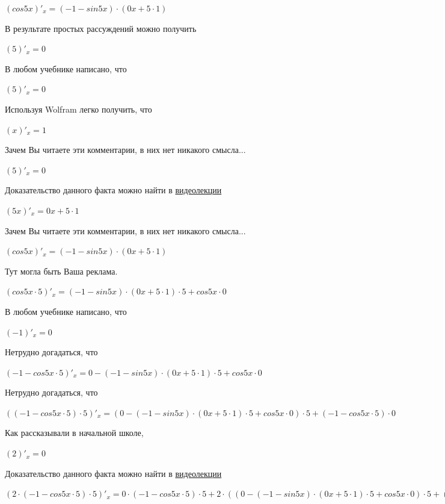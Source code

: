 \documentclass[12pt,a4paper,fleqn]{article}
\theoremstyle{definition}
\begin{document}
$(cos 5  x )'_{x} = ( -1  - sin 5  x ) \cdot ( 0  x  +  5  \cdot  1 )$

В результате простых рассуждений можно получить 

$( 5 )'_{x} =  0 $

В любом учебнике написано, что 

$( 5 )'_{x} =  0 $

Используя Wolfram легко получить, что 

$( x )'_{x} =  1 $

Зачем Вы читаете эти комментарии, в них нет никакого смысла... 

$( 5 )'_{x} =  0 $

Доказательство данного факта можно найти в \href{https://www.youtube.com/watch?v=dQw4w9WgXcQ}{видеолекции} 

$( 5  x )'_{x} =  0  x  +  5  \cdot  1 $

Зачем Вы читаете эти комментарии, в них нет никакого смысла... 

$(cos 5  x )'_{x} = ( -1  - sin 5  x ) \cdot ( 0  x  +  5  \cdot  1 )$

Тут могла быть Ваша реклама. 

$(cos 5  x  \cdot  5 )'_{x} = ( -1  - sin 5  x ) \cdot ( 0  x  +  5  \cdot  1 ) \cdot  5  + cos 5  x  \cdot  0 $

В любом учебнике написано, что 

$( -1 )'_{x} =  0 $

Нетрудно догадаться, что 

$( -1  - cos 5  x  \cdot  5 )'_{x} =  0  - ( -1  - sin 5  x ) \cdot ( 0  x  +  5  \cdot  1 ) \cdot  5  + cos 5  x  \cdot  0 $

Нетрудно догадаться, что 

$(( -1  - cos 5  x  \cdot  5 ) \cdot  5 )'_{x} = ( 0  - ( -1  - sin 5  x ) \cdot ( 0  x  +  5  \cdot  1 ) \cdot  5  + cos 5  x  \cdot  0 ) \cdot  5  + ( -1  - cos 5  x  \cdot  5 ) \cdot  0 $

Как рассказывали в начальной школе, 

$( 2 )'_{x} =  0 $

Доказательство данного факта можно найти в \href{https://www.youtube.com/watch?v=dQw4w9WgXcQ}{видеолекции} 

$( 2  \cdot ( -1  - cos 5  x  \cdot  5 ) \cdot  5 )'_{x} =  0  \cdot ( -1  - cos 5  x  \cdot  5 ) \cdot  5  +  2  \cdot (( 0  - ( -1  - sin 5  x ) \cdot ( 0  x  +  5  \cdot  1 ) \cdot  5  + cos 5  x  \cdot  0 ) \cdot  5  + ( -1  - cos 5  x  \cdot  5 ) \cdot  0 )$
\end{document}
